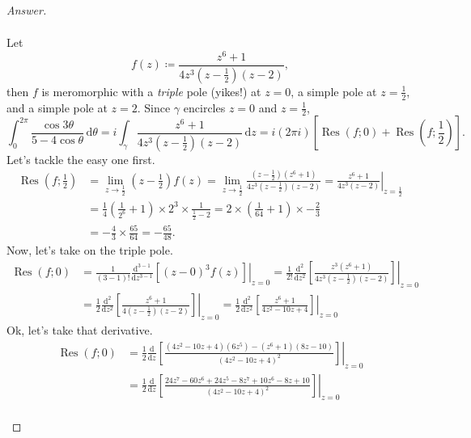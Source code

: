 \documentclass[12pt]{article}
\newcommand{\ita}[1]{\textit{#1}}
\newcommand\paren[1]{\left( #1 \right)}
\newcommand{\sqbrack}[1]{\left [ #1 \right ]}
\theoremstyle{definition}
\DeclareMathOperator\Res{Res}
\begin{document}
\begin{proof}[Answer]
\begin{enumerate}[(i)]
\begin{align*}
        \end{align*}
        Let 
        \[
            f(z) \coloneqq \frac{ z^6 + 1 }{ 4 z^3 \paren{ z - \frac{1}{2} }(z-2) },
        \]
        then $f$ is meromorphic with a \ita{triple} pole (yikes!) at $z = 0$, a simple pole at $z = \frac{1}{2}$, and a simple pole at $z = 2$. Since $\gamma$ encircles $z = 0$ and $z = \frac{1}{2}$, 
        \[
            \int_0^{2\pi} \frac{\cos 3 \theta}{5 - 4\cos \theta} \, \mathrm{d} \theta = i \int_{\gamma} \frac{ z^6 + 1 }{ 4 z^3 \paren{ z - \frac{1}{2} }(z-2) } \, \mathrm{d}z = i (2\pi i) \sqbrack{ \Res(f;0) + \Res \paren{f ; \frac{1}{2} } }.
        \]
        Let's tackle the easy one first. 
        \begin{align*}
            \Res \paren{f ; \frac{1}{2} } & = \lim\limits_{z \to \frac{1}{2} } \paren{ z - \frac{1}{2} } f(z) = \lim\limits_{z \to \frac{1}{2} } \frac{ \paren{ z - \frac{1}{2} } \paren{ z^6 + 1 } }{ 4 z^3 \paren{ z - \frac{1}{2} }(z-2) } = \left. \frac{ z^6 + 1 }{ 4 z^3 (z-2) } \right|_{ z = \frac{1}{2} } \\
            & = \frac{1}{4} \paren{ \frac{1}{2^6} + 1 } \times 2^3 \times \frac{1}{\frac{1}{2} - 2} = 2 \times \paren{ \frac{1}{64} + 1 } \times -\frac{2}{3} \\
            & = -\frac{4}{3} \times \frac{65}{64} = -\frac{65}{48}.
        \end{align*}
        Now, let's take on the triple pole. 
        \begin{align*}
            \Res(f;0) & = \frac{1}{(3-1)!} \frac{\mathrm{d}^{3-1}}{\mathrm{d}z^{3-1}} \left. \sqbrack{ (z - 0)^3 f(z) } \right|_{z = 0} = \frac{1}{2!} \frac{\mathrm{d}^{2}}{\mathrm{d}z^{2}} \left. \sqbrack{ \frac{ z^3 \paren{ z^6 + 1 } }{ 4 z^3 \paren{ z - \frac{1}{2} }(z-2) } } \right|_{z = 0} \\
            & = \frac{1}{2} \frac{\mathrm{d}^{2}}{\mathrm{d}z^{2}} \left. \sqbrack{ \frac{ z^6 + 1  }{ 4 \paren{ z - \frac{1}{2} }(z-2) } } \right|_{z = 0} = \frac{1}{2} \frac{\mathrm{d}^{2}}{\mathrm{d}z^{2}} \left. \sqbrack{ \frac{ z^6 + 1  }{ 4z^2 - 10z + 4 } } \right|_{z = 0} 
        \end{align*}
        Ok, let's take that derivative.
        \begin{align*}
            \Res(f;0) & = \frac{1}{2} \frac{\mathrm{d}}{\mathrm{d}z} \left. \sqbrack{ \frac{ \paren{ 4z^2 - 10z + 4 } \paren{ 6z^5 } - \paren{ z^6 + 1 } \paren{ 8z - 10 } }{ \paren{ 4z^2 - 10z + 4 }^2 } } \right|_{z = 0} \\ 
            & = \frac{1}{2} \frac{\mathrm{d}}{\mathrm{d}z} \left. \sqbrack{ \frac{ 24z^7 - 60z^6 + 24z^5 - 8z^7 + 10z^6 - 8z + 10 }{ \paren{ 4z^2 - 10z + 4 }^2 } } \right|_{z = 0} \\ 

\end{align*}
\end{enumerate}
\end{proof}
\end{document}
